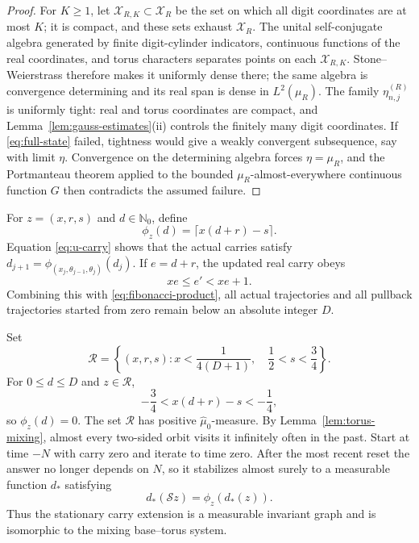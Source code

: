 \documentclass[11pt,a4paper]{amsart}
\theoremstyle{definition}
\theoremstyle{remark}
\newcommand{\N}{\mathbb N}
\begin{document}
\begin{proof}
For $K\ge1$, let $\mathcal X_{R,K}\subset\mathcal X_R$ be the set on which
all digit coordinates are at most $K$; it is compact, and these sets exhaust
$\mathcal X_R$.  The unital self-conjugate algebra generated by finite digit-cylinder
indicators, continuous functions of the real coordinates, and torus
characters separates points on each $\mathcal X_{R,K}$.
Stone--Weierstrass therefore makes it uniformly dense there;
the same algebra is convergence determining and its real span is dense in
$L^2(\mu_R)$.  The family $\eta_{n,j}^{(R)}$ is uniformly tight: real and
torus coordinates are compact, and Lemma~\ref{lem:gauss-estimates}(ii)
controls the finitely many digit coordinates.  If \eqref{eq:full-state}
failed, tightness would give a weakly convergent subsequence, say with limit
$\eta$.  Convergence on the determining algebra forces $\eta=\mu_R$, and the
Portmanteau theorem applied to the bounded $\mu_R$-almost-everywhere
continuous function $G$ then contradicts the assumed failure.
\end{proof}

For $z=(x,r,s)$ and $d\in\N_0$, define
\begin{equation}\label{eq:carry-map}
 \phi_z(d)=\lceil x(d+r)-s\rceil.
\end{equation}
Equation \eqref{eq:u-carry} shows that the actual carries satisfy
$d_{j+1}=\phi_{(x_j,\theta_{j-1},\theta_j)}(d_j)$.
If $e=d+r$, the updated real carry obeys
\begin{equation}\label{eq:carry-contraction}
 xe\le e'<xe+1.
\end{equation}
Combining this with \eqref{eq:fibonacci-product}, all actual trajectories and
all pullback trajectories started from zero remain below an absolute integer
$D$.

Set
\begin{equation}\label{eq:reset-set}
 \mathcal R=\left\{(x,r,s):
 x<\frac1{4(D+1)},\quad\frac12<s<\frac34\right\}.
\end{equation}
For $0\le d\le D$ and $z\in\mathcal R$,
\[
 -\frac34<x(d+r)-s<-\frac14,
\]
so $\phi_z(d)=0$.  The set $\mathcal R$ has positive
$\widehat\mu_0$-measure.  By Lemma~\ref{lem:torus-mixing}, almost every
two-sided orbit visits it infinitely often in the past.  Start at time $-N$
with carry zero and iterate to time zero.  After the most recent reset the
answer no longer depends on $N$, so it stabilizes almost surely to a
measurable function $d_*$ satisfying
\begin{equation}\label{eq:carry-graph}
 d_*(\mathcal Sz)=\phi_z(d_*(z)).
\end{equation}
Thus the stationary carry extension is a measurable invariant graph and is
isomorphic to the mixing base--torus system.
\end{document}
